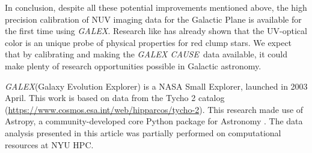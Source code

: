 \documentclass[12pt, preprint]{aastex61}
\newcommand{\project}[1]{\textsl{#1}}
\newcommand{\galex}{\project{GALEX}}
\newcommand{\cause}{\project{GALEX CAUSE}}
\begin{document}
In conclusion, despite all these potential improvements mentioned above, the high precision calibration of NUV imaging data for the Galactic Plane is available for the first time using \galex. 
Research like \cite{redclump} has already shown that the UV-optical color is an unique probe of physical properties for red clump stars.
We expect that by calibrating and making the \cause\ data available, it could make plenty of research opportunities possible in Galactic astronomy.

\acknowledgements
\galex (Galaxy Evolution Explorer) is a NASA Small Explorer, launched in 2003 April.
This work is based on data from the Tycho 2 catalog (\url{https://www.cosmos.esa.int/web/hipparcos/tycho-2}).
This research made use of Astropy, a community-developed core Python package for Astronomy \citep{astropy}.
The data analysis presented in this article was partially performed on computational resources at NYU HPC.

\clearpage

\clearpage
\end{document}
